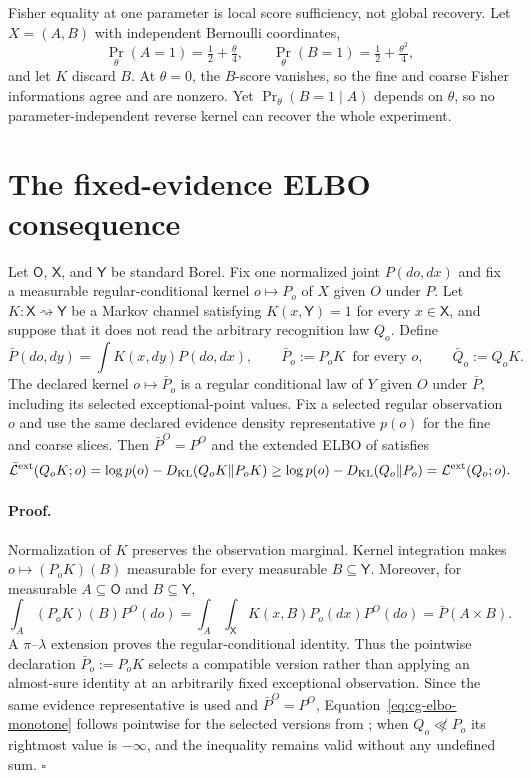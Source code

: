 Fisher equality at one parameter is local score sufficiency, not global
recovery. Let \(X=(A,B)\) with independent Bernoulli coordinates,
\[
\Pr_\theta(A=1)=\tfrac12+\tfrac\theta4,\qquad
\Pr_\theta(B=1)=\tfrac12+\tfrac{\theta^2}4,
\]
and let \(K\) discard \(B\). At \(\theta=0\), the \(B\)-score vanishes, so
the fine and coarse Fisher informations agree and are nonzero. Yet
\(\Pr_\theta(B=1\mid A)\) depends on \(\theta\), so no
parameter-independent reverse kernel can recover the whole experiment.

\section{The fixed-evidence ELBO consequence}
\label{sec:cg-elbo}

Let $\mathsf O$, $\mathsf X$, and $\mathsf Y$ be standard Borel.  Fix one
normalized joint $P(do,dx)$ and fix a measurable regular-conditional kernel
$o\mapsto P_o$ of $X$ given $O$ under $P$.  Let
$K:\mathsf X\rightsquigarrow\mathsf Y$ be a Markov channel satisfying
$K(x,\mathsf Y)=1$ for every $x\in\mathsf X$, and suppose that it does not
read the arbitrary recognition law $Q_o$.  Define
\begin{equation}
\bar P(do,dy)=\int K(x,dy)P(do,dx),\qquad
\bar P_o:=P_oK\ \text{ for every }o,\qquad
\bar Q_o:=Q_oK.
\label{eq:cg-fixed-joint-pushforward}
\end{equation}
The declared kernel $o\mapsto\bar P_o$ is a regular conditional law of $Y$
given $O$ under $\bar P$, including its selected exceptional-point values.
Fix a selected regular observation $o$ and use the same declared evidence
density representative $p(o)$ for the fine and coarse slices.  Then
$\bar P^O=P^O$ and the extended ELBO of  satisfies
\begin{equation}
\bar{\mathcal L}^{\mathrm{ext}}(Q_oK;o)
=\log p(o)-D_{\mathrm{KL}}(Q_oK\Vert P_oK)
\geq
\log p(o)-D_{\mathrm{KL}}(Q_o\Vert P_o)
=\mathcal L^{\mathrm{ext}}(Q_o;o).
\label{eq:cg-elbo-monotone}
\end{equation}

\paragraph{Proof.}
Normalization of $K$ preserves the observation marginal.  Kernel integration
makes $o\mapsto(P_oK)(B)$ measurable for every measurable $B\subseteq\mathsf Y$.
Moreover, for measurable $A\subseteq\mathsf O$ and $B\subseteq\mathsf Y$,
\[
 \int_A(P_oK)(B) P^O(do)
 =\int_A\int_{\mathsf X}K(x,B)P_o(dx) P^O(do)
 =\bar P(A\times B).
\]
A $\pi$--$\lambda$ extension proves the regular-conditional identity.  Thus
the pointwise declaration $\bar P_o:=P_oK$ selects a compatible version rather
than applying an almost-sure identity at an arbitrarily fixed exceptional
observation.  Since the same evidence representative is used and
$\bar P^O=P^O$, Equation~\eqref{eq:cg-elbo-monotone} follows pointwise for the
selected versions from ; when
$Q_o\not\ll P_o$ its rightmost value is $-\infty$, and the inequality remains
valid without any undefined sum. \(\square\)

